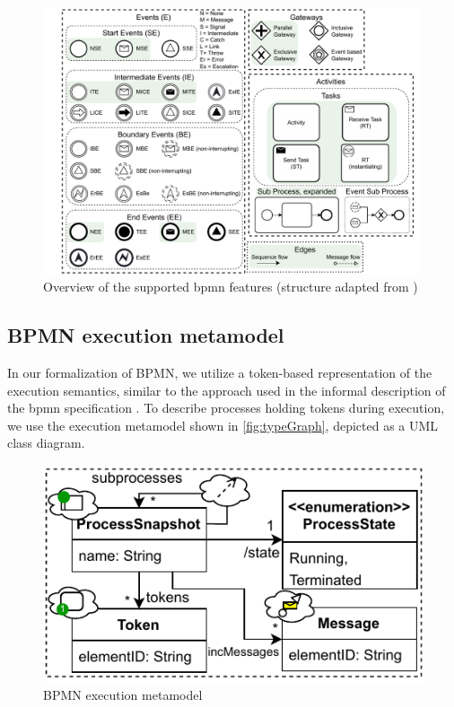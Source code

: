 \documentclass[runningheads]{llncs}
\begin{document}
\begin{figure}[ht]
    \centering
    \includegraphics[width=0.99\textwidth]{images/bpmn_semantics-feature-overview.pdf}
    \caption{Overview of the supported \gls*{bpmn} features (structure adapted from \cite{houhouFirstOrderLogicVerification2022})}
    \label{fig:bpmnfeaturesOverview}
\end{figure}


\subsection{BPMN execution metamodel}

In our formalization of BPMN, we utilize a token-based representation of the execution semantics, similar to the approach used in the informal description of the \gls*{bpmn} specification \cite{objectmanagementgroupBusinessProcessModel2013}.
To describe processes holding tokens during execution, we use the execution metamodel shown in \autoref{fig:typeGraph}, depicted as a UML class diagram.

\begin{figure}[ht]
  \centering
  \includegraphics[width=0.6\linewidth]{images/bpmn_semantics-typegraph.pdf}
  \caption{BPMN execution metamodel}
  \label{fig:typeGraph}
\end{figure}
\end{document}
